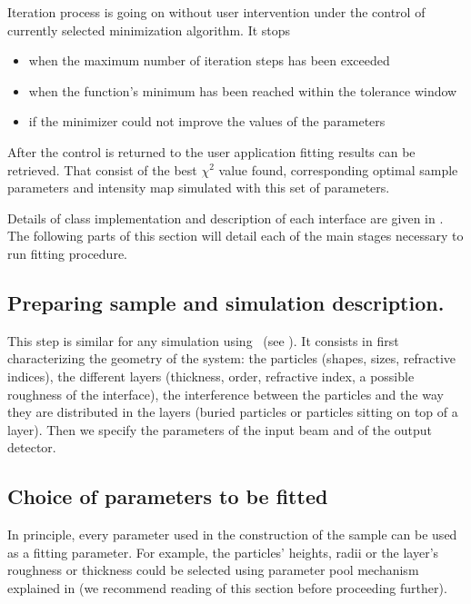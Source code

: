 Iteration process is going on without user intervention under the control of currently selected minimization algorithm. It stops 
\begin{itemize}
\item when the maximum number of iteration steps has been exceeded
\item when the function's minimum has been reached within the tolerance window 
\item if the minimizer could not improve the values of the parameters 
\end{itemize}

After the control is returned to the user application fitting results can be retrieved.
That consist of the best $\chi^2$ value found, corresponding optimal sample parameters and intensity map simulated with this set of parameters.

Details of  class implementation and description
of each interface are given in . The following parts of this section will detail each of
the main stages necessary to run fitting procedure.


\subsection{Preparing sample and simulation description.}


This step is similar for any simulation using \BornAgain\ (see ). It consists in first characterizing  the geometry of the system: the particles 
(shapes, sizes, refractive
indices), the different layers (thickness,
order, refractive index, a possible roughness of the interface), the
interference between the particles and the way they are distributed in
the layers (buried particles or particles sitting on top of a
layer). 
Then we specify the parameters of the input beam and of the
output detector.



\subsection{Choice of parameters to be fitted}
In principle, every parameter used in the construction of the sample
can be used as a fitting parameter. For example, the particles'
heights, radii or the layer's roughness or thickness could be selected using
parameter pool mechanism explained in  (we recommend
reading of this section before proceeding further).

